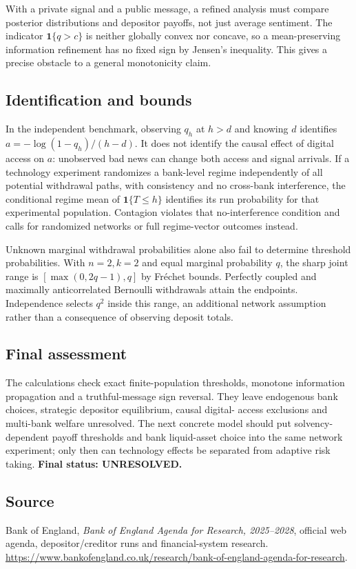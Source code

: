 \documentclass[11pt]{article}
\begin{document}
With a private signal and a public message, a refined analysis must compare
posterior distributions and depositor payoffs, not just average sentiment.
The indicator $\mathbf1\{q>c\}$ is neither globally convex nor concave,
so a mean-preserving information refinement has no fixed sign by Jensen's
inequality. This gives a precise obstacle to a general monotonicity claim.

\subsection*{Identification and bounds}
In the independent benchmark, observing $q_h$ at $h>d$ and knowing $d$
identifies $a=-\log(1-q_h)/(h-d)$. It does not identify the causal effect
of digital access on $a$: unobserved bad news can change both access and
signal arrivals. If a technology experiment randomizes a bank-level regime
independently of all potential withdrawal paths, with consistency and no
cross-bank interference, the conditional regime mean of
$\mathbf1\{T\leq h\}$ identifies its run probability for that experimental
population. Contagion violates that no-interference condition and calls for
randomized networks or full regime-vector outcomes instead.

Unknown marginal withdrawal probabilities alone also fail to determine
threshold probabilities. With $n=2,k=2$ and equal marginal probability
$q$, the sharp joint range is $[\max(0,2q-1),q]$ by Fr\'echet bounds.
Perfectly coupled and maximally anticorrelated Bernoulli withdrawals attain
the endpoints. Independence selects $q^2$ inside this range, an additional
network assumption rather than a consequence of observing deposit totals.

\subsection*{Final assessment}
The calculations check exact finite-population thresholds, monotone
information propagation and a truthful-message sign reversal. They leave
endogenous bank choices, strategic depositor equilibrium, causal digital-
access exclusions and multi-bank welfare unresolved. The next concrete
model should put solvency-dependent payoff thresholds and bank liquid-asset
choice into the same network experiment; only then can technology effects
be separated from adaptive risk taking. \textbf{Final status: UNRESOLVED.}

\subsection*{Source}
Bank of England, \emph{Bank of England Agenda for Research, 2025--2028},
official web agenda, depositor/creditor runs and financial-system research.
\url{https://www.bankofengland.co.uk/research/bank-of-england-agenda-for-research}.
\end{document}
